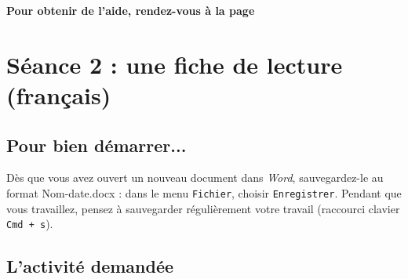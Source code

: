 
\textbf{Pour obtenir de l'aide, rendez-vous à la page \pageref{aide_seancesWord3}}


\vfill




%
%
%
%

\pagebreak

\section{Séance 2 : une fiche de lecture (français)}\label{ficheTexte4e3}

\subsection{Pour bien démarrer...}

Dès que vous avez ouvert un nouveau document dans \emph{Word}, sauvegardez-le au format Nom-date.docx : dans le menu \texttt{Fichier}, choisir \texttt{Enregistrer}. Pendant que vous travaillez, pensez à sauvegarder régulièrement votre travail (raccourci clavier \texttt{Cmd + s}).   


\subsection{L'activité demandée}

\vspace{10pt}

